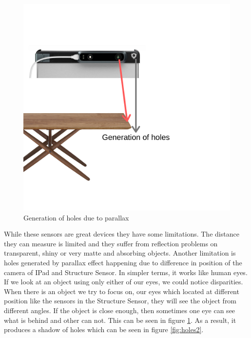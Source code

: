 \begin{figure}[h]
    \centering
    \includegraphics[scale=0.4]{Figures/holes.png}
    \caption{Generation of holes due to parallax}
    \label{fig:holes}
\end{figure}
While these sensors are great devices they have some limitations. The distance they can measure is limited and they suffer from reflection problems on transparent, shiny or very matte and absorbing objects. Another limitation is holes generated by parallax effect happening due to difference in position of the camera of IPad and Structure Sensor\cite{Kalantari}. In simpler terms, it works like human eyes. If we look at an object using only either of our eyes, we could notice disparities. When there is an object we try to focus on, our eyes which located at different position like the sensors in the Structure Sensor, they will see the object from different angles. If the object is close enough, then sometimes one eye can see what is behind and other can not. This can be seen in figure \ref{fig:holes}. As a result, it produces a shadow of holes which can be seen in figure \ref{fig:holes2}.



